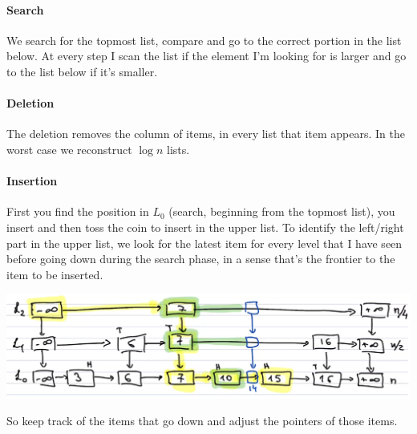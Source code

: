 \documentclass[10pt]{report}
\begin{document}
\paragraph{Search} We search for the topmost list, compare and go to the correct portion in the list below. At every step I scan the list if the element I'm looking for is larger and go to the list below if it's smaller.
\paragraph{Deletion} The deletion removes the column of items, in every list that item appears. In the worst case we reconstruct $\log n$ lists.
\paragraph{Insertion} First you find the position in $L_0$ (search, beginning from the topmost list), you insert and then toss the coin to insert in the upper list. To identify the left/right part in the upper list, we look for the latest item for every level that I have seen before going down during the search phase, in a sense that's the frontier to the item to be inserted.
\begin{center}
	\includegraphics[scale=0.5]{9.png}
\end{center}
So keep track of the items that go down and adjust the pointers of those items.
\end{document}
